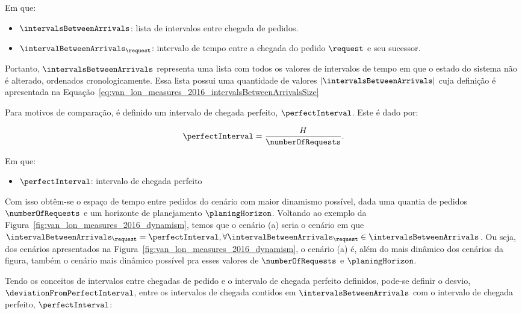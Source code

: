 Em que:
\begin{itemize}
  \item $\intervalsBetweenArrivals$: lista de intervalos entre chegada de 
    pedidos.
  \item $\intervalBetweenArrivals_\request$: intervalo de tempo entre a chegada
    do pedido $\request$ e seu sucessor.
\end{itemize}

Portanto, $\intervalsBetweenArrivals$ representa uma lista com todos os valores
de intervalos de tempo em que o estado do sistema não é alterado, ordenados
cronologicamente.
Essa lista possui uma quantidade de valores $|\intervalsBetweenArrivals|$ 
cuja definição é apresentada na
Equação~\ref{eq:van_lon_measures_2016_intervalsBetweenArrivalsSize}

Para motivos de comparação, é definido um intervalo de chegada perfeito,
$\perfectInterval$. Este é dado por:

\begin{equation}
    \perfectInterval = \frac{H}{\numberOfRequests}.
    \label{eq:van_lon_measures_2016_perfectInterval}
  \end{equation}

Em que:
\begin{itemize}
  \item $\perfectInterval$: intervalo de chegada perfeito
\end{itemize}

Com isso obtêm-se o espaço de tempo entre pedidos do cenário com maior
dinamismo possível, dada uma quantia de pedidos $\numberOfRequests$ 
e um horizonte de planejamento $\planingHorizon$.
Voltando ao exemplo da Figura~\ref{fig:van_lon_measures_2016_dynamism},
temos que o cenário (a) seria o cenário em que
$\intervalBetweenArrivals_\request = \perfectInterval, \forall
\intervalBetweenArrivals_\request \in \intervalsBetweenArrivals$.
Ou seja, dos cenários apresentados na 
Figura~\ref{fig:van_lon_measures_2016_dynamism}, o cenário (a) é, além do mais
dinâmico dos cenários da figura, também o cenário mais dinâmico possível pra
esses valores de $\numberOfRequests$ e $\planingHorizon$.

Tendo os conceitos de intervalos entre chegadas de pedido e o intervalo de
chegada perfeito definidos, pode-se definir o desvio,
$\deviationFromPerfectInterval$, entre os intervalos de chegada contidos em
$\intervalsBetweenArrivals$ com o intervalo de chegada perfeito,
$\perfectInterval$:

